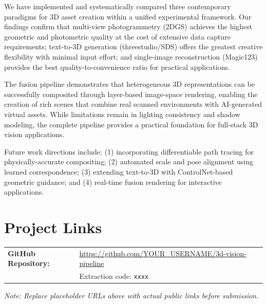 \documentclass{article}
\begin{document}
We have implemented and systematically compared three contemporary paradigms for
3D asset creation within a unified experimental framework. Our findings confirm
that multi-view photogrammetry (2DGS) achieves the highest geometric and
photometric quality at the cost of extensive data capture requirements; text-to-3D
generation (threestudio/SDS) offers the greatest creative flexibility with
minimal input effort; and single-image reconstruction (Magic123) provides the
best quality-to-convenience ratio for practical applications.

The fusion pipeline demonstrates that heterogeneous 3D representations can be
successfully composited through layer-based image-space rendering, enabling the
creation of rich scenes that combine real scanned environments with AI-generated
virtual assets. While limitations remain in lighting consistency and shadow
modeling, the complete pipeline provides a practical foundation for full-stack
3D vision applications.

Future work directions include: (1) incorporating differentiable path tracing for
physically-accurate compositing; (2) automated scale and pose alignment using
learned correspondence; (3) extending text-to-3D with ControlNet-based geometric
guidance; and (4) real-time fusion rendering for interactive applications.

\section*{Project Links}

\noindent
\begin{tabular}{@{}ll@{}}
\textbf{GitHub Repository:} & \url{https://github.com/YOUR_USERNAME/3d-vision-pipeline} \\
& Extraction code: \texttt{xxxx} \\
\end{tabular}

\vspace{8pt}
\noindent\textit{Note: Replace placeholder URLs above with actual public links before submission.}
\end{document}
